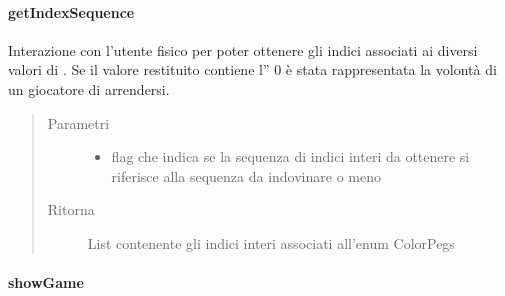 \documentclass[letterpaper,10pt,italian,openany,oneside]{sphinxmanual}
\begin{document}
\paragraph{getIndexSequence}
\label{\detokenize{source/it/unicam/cs/pa/mastermind/ui/GameView:getindexsequence}}

\begin{fulllineitems}
\label{\detokenize{source/it/unicam/cs/pa/mastermind/ui/GameView:it.unicam.cs.pa.mastermind.ui.GameView.getIndexSequence(boolean)}}
Interazione con l’utente fisico per poter ottenere gli indici associati ai diversi valori di . Se il valore restituito contiene l” 0 è stata rappresentata la volontà di un giocatore  di arrendersi.
\begin{quote}\begin{description}
\item[{Parametri}] \leavevmode\begin{itemize}
\item {} 
 \textendash{} flag che indica se la sequenza di indici interi da ottenere si riferisce alla sequenza da indovinare o meno

\end{itemize}

\item[{Ritorna}] \leavevmode
List contenente gli indici interi associati all’enum ColorPegs

\end{description}\end{quote}

\end{fulllineitems}



\paragraph{showGame}
\label{\detokenize{source/it/unicam/cs/pa/mastermind/ui/GameView:showgame}}
\end{document}
